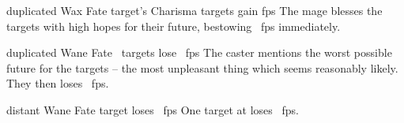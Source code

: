   {duplicated}%
  {Wax}%
  {Fate}%
  {target's Charisma}%
  {\spellArea{} targets gain  \glspl{fp}}%
  {
    The mage blesses the targets with high hopes for their future, bestowing \showDam~\glspl{fp} immediately.
  }

  {duplicated}%
  {Wane}%
  {Fate}%
  {}%
  {\spellArea\ targets lose \showDam~\glspl{fp}}%
  {
    The caster mentions the worst possible future for the targets -- the most unpleasant thing which seems reasonably likely.
    They then loses \showDam~\glspl{fp}.
  }

  {distant}%
  {Wane}%
  {Fate}%
  {}%
  {target loses \showDam~\glspl{fp}}%
  {
    One target at \spellRange{} loses \showDam~\glspl{fp}.
  }

